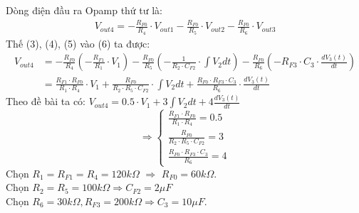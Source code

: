 				\hspace*{0.6cm}Dòng điện đầu ra Opamp thứ tư là:
				\begin{align}
					V_{out4} = -\frac{R_{F0}}{R_4} \cdot V_{out1} - \frac{R_{F0}}{R_5} \cdot V_{out2} - \frac{R_{F0}}{R_6} \cdot V_{out3}
				\end{align}
				\hspace*{0.6cm}Thế (3), (4), (5) vào (6) ta được:
				\begin{align*}
					V_{out4} &= -\frac{R_{F0}}{R_4}\left(-\frac{R_{F1}}{R_1} \cdot V_1\right) - \frac{R_{F0}}{R_5}\left(-\frac{1}{R_2 \cdot C_{F2}} \cdot \int V_{2} dt\right) - \frac{R_{F0}}{R_6}\left(-R_{F3} \cdot C_{3} \cdot \frac{dV_{3}(t)}{dt}\right)\\
						 &= \frac{R_{F1} \cdot R_{F0}}{R_1 \cdot R_4} \cdot V_1 + \frac{R_{F0}}{R_2 \cdot R_5 \cdot C_{F2}} \cdot \int V_{2} dt + \frac{R_{F0} \cdot R_{F3} \cdot C_{3}}{R_6} \cdot \frac{dV_{3}(t)}{dt}
				\end{align*}
				\newpage
				Theo đề bài ta có: $V_{out4} = 0.5 \cdot V_1 + 3 \int V_{2} dt + 4 \frac{dV_{3}(t)}{dt}$ 
				\[
				\Rightarrow
				\begin{cases}
					\frac{R_{F1} \cdot R_{F0}}{R_1 \cdot R_4} = 0.5\\
					\frac{R_{F0}}{R_2 \cdot R_5 \cdot C_{F2}} = 3\\
					\frac{R_{F0} \cdot R_{F3} \cdot C_{3}}{R_6} = 4
				\end{cases}
				\]
				\hspace*{0.6cm}Chọn $R_{1} = R_{F1} = R_{4} = 120k\Omega$ $\Rightarrow$ $R_{F0} = 60k\Omega$.\\
				\hspace*{0.6cm}Chọn $R_{2} = R_{5} = 100k\Omega \Rightarrow C_{F2} = 2\mu F$\\
				\hspace*{0.6cm}Chọn $R_{6} = 30k\Omega, R_{F3} = 200k\Omega \Rightarrow C_{3} = 10\mu F$.\\
